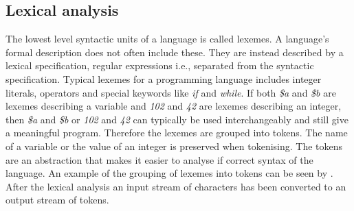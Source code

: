 \begin{figure}
	\begin{center}
	\end{center}
	\label{fig:compileroverview}
\end{figure}

\subsection{Lexical analysis}
The lowest level syntactic units of a language is called lexemes. A language's formal description does not often include these. They are instead described by a lexical specification, regular expressions i.e., separated from the syntactic specification\cite[p. 135]{sebesta2013}. Typical lexemes for a programming language includes integer literals, operators and special keywords like \textit{if} and \textit{while}. If both \textit{\$a} and \textit{\$b} are lexemes describing a variable and \textit{102} and \textit{42} are lexemes describing an integer, then \textit{\$a} and \textit{\$b} or \textit{102} and \textit{42} can typically be used interchangeably and still give a meaningful program. Therefore the lexemes are grouped into tokens. The name of a variable or the value of an integer is preserved when tokenising. The tokens are an abstraction that makes it easier to analyse if correct syntax of the language. An example of the grouping of lexemes into tokens can be seen by . After the lexical analysis an input stream of characters has been converted to an output stream of tokens.

